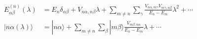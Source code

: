 \begin{align*}
    E^{(n)}_{\alpha\beta}(\lambda) &= E_{n}\delta_{\alpha\beta} + V_{n\alpha,n\beta}\lambda + \sum_{m\neq n}\sum_{\gamma}\frac{V_{n\alpha,m\gamma}V_{m\gamma,n\beta}}{E_{n}-E_{m}}\lambda^{2} + \cdots\\
    |n\alpha(\lambda)\rangle &= |n\alpha\rangle + \sum_{m\neq n}\sum_{\beta}|m\beta\rangle\frac{V_{m\beta,n\alpha}}{E_{n}-E_{m}}\lambda + \cdots
\end{align*}